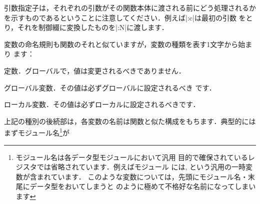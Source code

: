 \documentclass[uplatex,dvipdfmx,full,kernel]{wtpl3doc}
\begin{document}
%
引数指定子は，それぞれの引数がその関数本体に渡される前にどう処理されるか
を示すものであるということに注意してください．例えば|\foo:c|は最初の引数
をとり，それを制御綴に変換したものを|\foo:N|に渡します．

変数の命名規則も関数のそれと似ていますが，変数の種類を表す1文字から始まり
ます：
%
\begin{description}[style=multiline, leftmargin=3zw]
  \item[\code{c}] 定数．グローバルで，値は変更されるべきでありません．
  \item[\code{g}] グローバル変数．その値は必ずグローバルに設定されるべき
    です．
  \item[\code{l}] ローカル変数．その値は必ずローカルに設定されるべきです．
\end{description}
%
上記の種別の後続部は，各変数の名前は関数と似た構成をもちます．典型的には
まずモジュール名\footnote{モジュール名は各データ型モジュールにおいて汎用
目的で確保されているレジスタでは省略されています．例えばモジュール
には, という汎用の一時変数が含まれています．
このような変数については，先頭にモジュール名・末尾にデータ型をおいてしまうと
のように極めて不格好な名前になってしまいます}が
\end{document}
